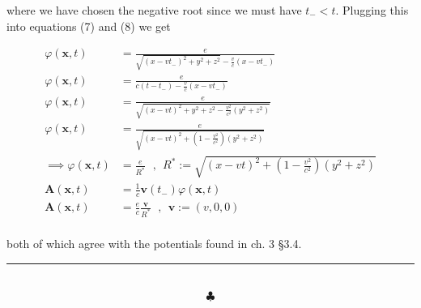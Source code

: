 \documentclass{article}
\begin{document}
where we have chosen the negative root since we must have $t_- <t$. Plugging this into equations (7) and (8) we get

\begin{equation}
\begin{split}
\varphi( \bm{x}, t) & =  \frac{e}{  \sqrt{ (x-vt_-)^2 + y^2 +z^2  }  - \frac{v}{c}(x-vt_-) }   \\
\varphi( \bm{x}, t) & =  \frac{e}{  c(t - t_-) - \frac{v}{c}(x-vt_-) }   \\
\varphi( \bm{x}, t) & =  \frac{e}{ \sqrt{ (x-vt)^2 + y^2+z^2 - \frac{v^2}{c^2}(y^2+z^2) }}   \\
\varphi( \bm{x}, t) & =  \frac{e}{ \sqrt{ (x-vt)^2 + \left(1 - \frac{v^2}{c^2} \right)(y^2+z^2)} }   \\
\implies \varphi( \bm{x}, t) & =  \frac{e}{ R^* } \; \text{   ,   } \; R^* := \sqrt{ (x-vt)^2 + \left(1 - \frac{v^2}{c^2} \right)(y^2+z^2)}\\
\bm{A}( \bm{x}, t) & =  \frac{1}{c}   \bm{v}(t_-)  \varphi( \bm{x},t)\\
\bm{A}( \bm{x}, t) & = \frac{e}{c} \frac{\bm{v}}{R^*}  \; \text{   ,   } \; \bm{v} := (v, 0, 0) \\
\end{split}
\end{equation}


both of which agree with the potentials found in ch. 3 \S 3.4. 


\noindent\rule{15cm}{0.4pt} \\
$$\clubsuit$$
\end{document}
